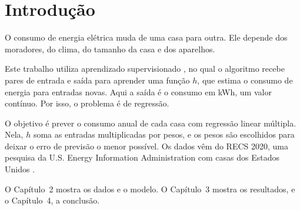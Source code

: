 \chapter{Introdução}

O consumo de energia elétrica muda de uma casa para outra. Ele depende dos
moradores, do clima, do tamanho da casa e dos aparelhos.

Este trabalho utiliza aprendizado supervisionado \cite{ia2013}, no qual o algoritmo recebe
pares de entrada e saída para aprender uma função $h$, que estima o consumo de energia para entradas novas.
Aqui a saída é o consumo em kWh, um valor contínuo. Por isso, o
problema é de regressão.

O objetivo é prever o consumo anual de cada casa com regressão linear
múltipla. Nela, $h$ soma as entradas multiplicadas por pesos, e os pesos são
escolhidos para deixar o erro de previsão o menor possível. Os dados vêm do
RECS 2020, uma pesquisa da U.S. Energy Information Administration com casas
dos Estados Unidos \cite{eia2020recs}.

O Capítulo~2 mostra os dados e o modelo. O Capítulo~3 mostra os resultados, e
o Capítulo~4, a conclusão.
